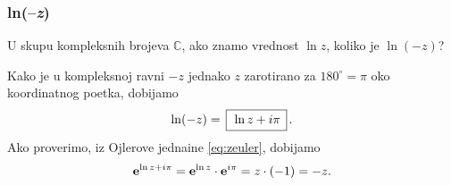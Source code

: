 \subsubsection{ln(--\textit{z})}

\zadatak U skupu kompleksnih brojeva $\mathbb C$, ako znamo vrednost $\ln z$,
koliko je $\ln(-z)$?

\resenje Kako je u kompleksnoj ravni $-z$ jednako $z$ zarotirano za $180^\circ=\pi$ oko
koordi\-natnog po{\cv}etka, dobijamo
$$
\ln (-z) = \ram{\ln z +i\pi}.
$$ 
Ako proverimo, iz Ojlerove jedna{\cv}ine \eqref{eq:zeuler}, dobijamo
$$
{\bf e}^{\ln z+i\pi} = {\bf e}^{\ln z}\cdot {\bf e}^{i\pi}=z \cdot (-1)=-z.
$$
